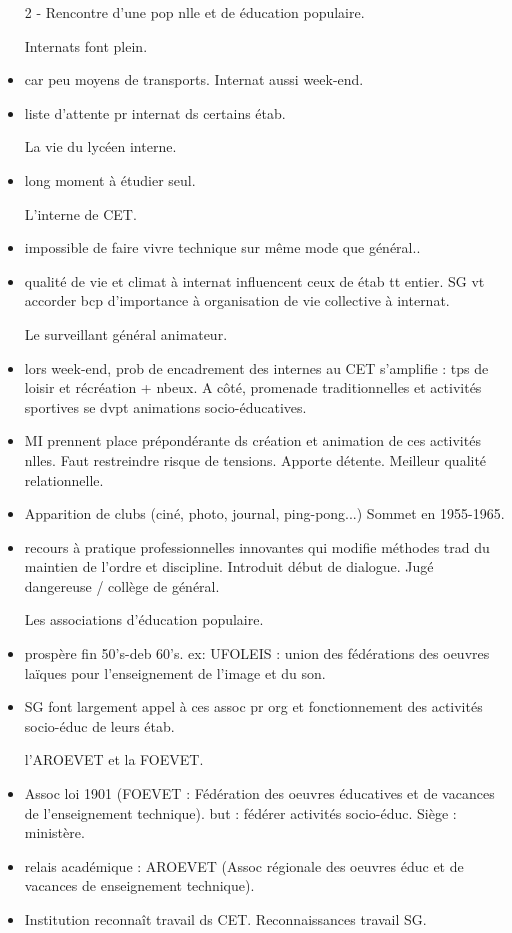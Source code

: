\documentclass[12pt]{article}
\begin{document}
\begin{itemize}
2 - Rencontre d'une pop nlle et de éducation populaire.

Internats font plein.
\item car peu moyens de transports. Internat aussi week-end.
\item liste d'attente pr internat ds certains étab.

La vie du lycéen interne.
\item long moment à étudier seul.

L'interne de CET.
\item impossible de faire vivre technique sur même mode que général..
\item qualité de vie et climat à internat influencent ceux de étab tt entier. SG vt accorder bcp d'importance à organisation de vie collective à internat.

Le surveillant général animateur.
\item lors week-end, prob de encadrement des internes au CET s'amplifie : tps de loisir et récréation + nbeux. A côté, promenade traditionnelles et activités sportives se dvpt animations socio-éducatives.
\item MI prennent place prépondérante ds création et animation de ces activités nlles. Faut restreindre risque de tensions. Apporte détente. Meilleur qualité relationnelle.
\item Apparition de clubs (ciné, photo, journal, ping-pong...) Sommet en 1955-1965.
\item recours à pratique professionnelles innovantes qui modifie méthodes trad du maintien de l'ordre et discipline. Introduit début de dialogue. Jugé dangereuse / collège de général. 

Les associations d'éducation populaire.
\item prospère fin 50's-deb 60's. ex: UFOLEIS : union des fédérations des oeuvres laïques pour l'enseignement de l'image et du son.
\item SG font largement appel à ces assoc pr org et fonctionnement des activités socio-éduc de leurs étab.

l'AROEVET et la FOEVET.
\item Assoc loi 1901 (FOEVET : Fédération des oeuvres éducatives et de vacances de l'enseignement technique). but : fédérer activités socio-éduc. Siège : ministère.
\item relais académique : AROEVET (Assoc régionale des oeuvres éduc et de vacances de enseignement technique). 
\item Institution reconnaît travail ds CET. Reconnaissances travail SG.


\end{itemize}
\end{document}
